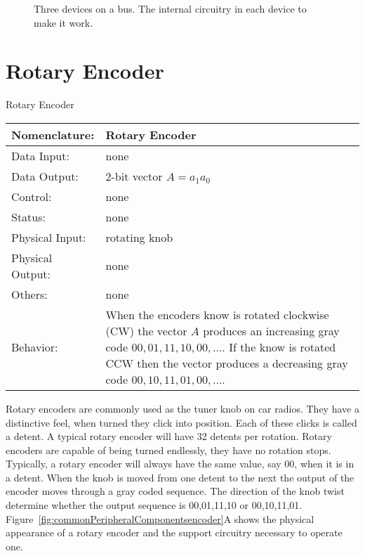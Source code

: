 \begin{figure}[ht]
\caption{Three devices on a bus.  The internal circuitry in
each device to make it work.}
\label{fig:comboBBbus}
\end{figure}









\section{Rotary Encoder}
\label{page:rotary}
\begin{buildingblock}{Rotary Encoder}
\begin{tabular}{|l|p{3.5in}|} \hline
Nomenclature:  & Rotary Encoder                           \\ \hline
Data Input:    & none         \\ \hline
Data Output:   & 2-bit vector $A=a_1 a_0$   \\ \hline
Control:       & none           \\ \hline
Status:        & none                                   \\ \hline
Physical Input:& rotating knob		\\ \hline
Physical Output:& none		\\ \hline
Others:        & none                   \\ \hline
Behavior:      & When the encoders know is rotated clockwise (CW) the
vector $A$ produces an increasing gray code $00, 01, 11, 10, 00, ...$.
If the know is rotated CCW then the vector produces a decreasing gray
code $00,10,11,01,00, ...$. \\ \hline
\end{tabular}
\end{buildingblock}

Rotary encoders are commonly used as the tuner knob on car radios.
They have a distinctive feel, when turned they click into 
position.  Each of these clicks is called a detent.   A typical
rotary encoder will have 32 detents per rotation.  Rotary encoders 
are capable of being turned endlessly,
they have no rotation stops.  Typically, a rotary encoder will always have the
same value, say 00, when it is in a detent.  When the knob is moved 
from one detent to the next the output of the encoder moves through
a gray coded sequence.  The direction of the knob twist determine whether the
output sequence is 00,01,11,10 or 00,10,11,01.    
Figure~\ref{fig:commonPeripheralComponentsencoder}A shows the physical appearance of a rotary 
encoder and the support circuitry necessary to operate one.

